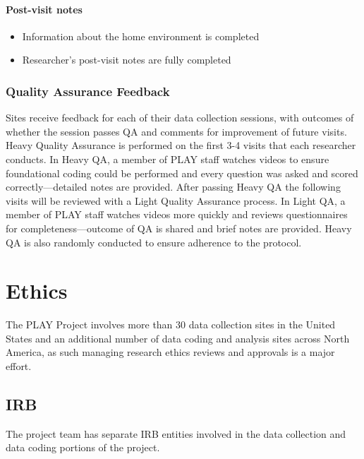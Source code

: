 \documentclass[
  12pt,
]{book}
\providecommand{\tightlist}{%
  \setlength{\itemsep}{0pt}\setlength{\parskip}{0pt}}
\begin{document}
\hypertarget{post-visit-notes}{%
\subsection{Post-visit notes}\label{post-visit-notes}}

\begin{itemize}
\tightlist
\item
  Information about the home environment is completed
\item
  Researcher's post-visit notes are fully completed
\end{itemize}

\hypertarget{quality-assurance-feedback}{%
\section{Quality Assurance Feedback}\label{quality-assurance-feedback}}

Sites receive feedback for each of their data collection sessions, with outcomes of whether the session passes QA and comments for improvement of future visits. Heavy Quality Assurance is performed on the first 3-4 visits that each researcher conducts. In Heavy QA, a member of PLAY staff watches videos to ensure foundational coding could be performed and every question was asked and scored correctly---detailed notes are provided. After passing Heavy QA the following visits will be reviewed with a Light Quality Assurance process. In Light QA, a member of PLAY staff watches videos more quickly and reviews questionnaires for completeness---outcome of QA is shared and brief notes are provided. Heavy QA is also randomly conducted to ensure adherence to the protocol.

\hypertarget{part-ethics}{%
\part{Ethics}\label{part-ethics}}

The PLAY Project involves more than 30 data collection sites in the United States and an additional number of data coding and analysis sites across North America, as such managing research ethics reviews and approvals is a major effort.

\hypertarget{irb}{%
\chapter{IRB}\label{irb}}

The project team has separate IRB entities involved in the data collection and data coding portions of the project.
\end{document}
